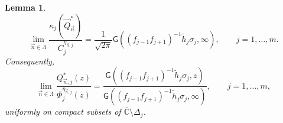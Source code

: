 \documentclass{amsart}
\numberwithin{equation}{section}
\newtheorem{lemma}[theorem]{Lemma}
\theoremstyle{definition}
\newcommand{\CC}{\mathbb{C}}      %
\newcommand{\n}{\vec{n}}          %
\begin{document}
\begin{lemma}
        \begin{equation*}
            \lim_{\n\in\Lambda} \frac{\kappa_{j}(\vec{Q}_{\n}^*)}{C_j^{\eta_{\n,j}}} = \frac{1}{\sqrt{2\pi}}\mathsf{G}\left((f_{j-1}f_{j+1})^{-1}\tilde{h}_j\sigma_j,\infty\right),\qquad j=1,\ldots,m.
        \end{equation*}
                Consequently,
        \begin{equation}
            \label{limfund*}
            \lim_{\n\in\Lambda} \frac{Q^*_{\n,j}(z)}{\Phi_j^{\eta_{\n,j}}(z)} = \frac{\mathsf{G}\left((f_{j-1}f_{j+1})^{-1}\tilde{h}_j\sigma_j,z\right)}{\mathsf{G}\left((f_{j-1}f_{j+1})^{-1}\tilde{h}_j\sigma_j,\infty\right)}, \qquad j=1,\ldots,m,
        \end{equation}
     uniformly on compact subsets of $\overline{\CC}\setminus \Delta_j$.
    \end{lemma}
\end{document}
